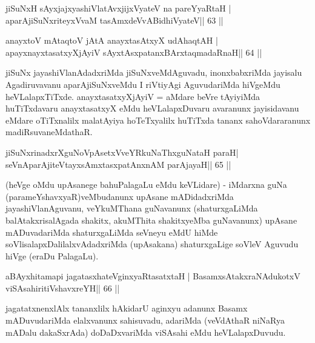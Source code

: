 

\begin{shl}
jiSuNxH sAyxjajxyashiVlatAvxjijxVyateV na pareYyaRtaH |
aparAjiSuNxriteyxVvaM tasAmxdeVvABidhiVyateV\hfill || 63 ||
\end{shl}

\begin{shl}
anayxtoV mAtaqtoV jAtA anayxtasAtxyX udAhaqtAH |
apayxnayxtasatxyXjAyiV sAyxtAsxpatanxBArxtaqmadaRnaH\hfill || 64 ||
\end{shl}

\begin{artha}
jiSuNx jayashiVlanAdadxriMda jiSuNxveMdAguvadu, inonxbabxriMda jayisalu  Agadiruvavanu aparAjiSuNxveMdu I riVtiyAgi AguvudariMda hiVgeMdu heVLalapxTiTxde. anayxtasatxyXjAyiV = aMdare beVre tAyiyiMda huTiTxdavaru anayxtasatxyX eMdu heVLalapxDuvaru avaranunx jayisidavanu eMdare oTiTxnalilx malatAyiya hoTeTxyalilx huTiTxda tananx sahoVdararanunx madiRsuvaneMdathaR.
\end{artha}

\begin{shl}
jiSuNxrinadxrXguNoVpAsetxVveYRkuNaThxguNataH paraH|
seVnA\s parAjiteVtayxsAmxtasxpatAnxnAM parAjayaH\hfill || 65 ||
\end{shl}

\begin{artha}
(heVge oMdu upAsanege bahuPalagaLu eMdu keVLidare) - iMdarxna guNa (parameYshavxyaR)veMbudanunx upAsane mADidadxriMda jayashiVlanAguvanu, veYkuMThana guNavanunx (shaturxgaLiMda balAtakxrisalAgada shakitx, akuMThita shakitxyeMba guNavanunx) upAsane mADuvadariMda shaturxgaLiMda seVneyu eMdU hiMde soVlisalapxDalilalxvAdadxriMda (upAsakana) shaturxgaLige soVleV Aguvudu hiVge (eraDu PalagaLu).
\end{artha}


\begin{shl}
aBAyxhitamapi jagatasxhateV\s ginxyaRtasatxtaH |
BasamxsAtakxraNAdukotxV viSAsahiritiVshavxreYH\hfill || 66 ||
\end{shl}

\begin{artha}
jagatatxnenxlAlx tananxlilx hAkidarU aginxyu adanunx Basamx mADuvudariMda elalxvanunx sahisuvadu, adariMda (veVdAthaR niNaRya mADalu dakaSxrAda) doDaDxvariMda viSAsahi eMdu heVLalapxDuvudu.
\end{artha}

